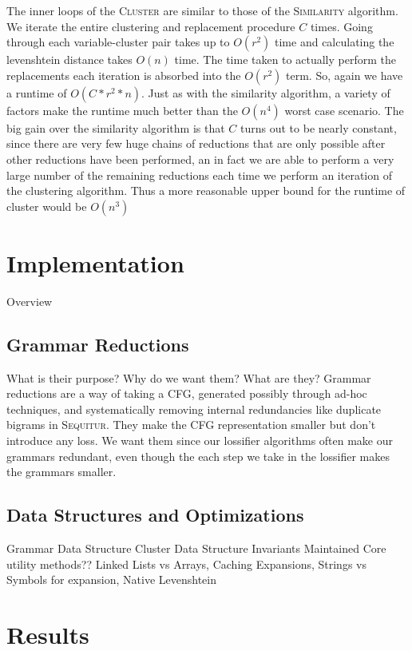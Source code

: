 \documentclass[11pt]{article}
\newcommand{\Sequitur}{\textsc{Sequitur}\xspace}
\newcommand{\Similarity}{\textsc{Similarity}\xspace}
\newcommand{\Cluster}{\textsc{Cluster}\xspace}
\begin{document}
The inner loops of the \Cluster are similar to those of the \Similarity
algorithm.  We iterate the entire clustering and replacement procedure $C$
times. Going through each variable-cluster pair takes up to $O(r^2)$ time and
calculating the levenshtein distance takes $O(n)$ time. The time taken to
actually perform the replacements each iteration is absorbed into the $O(r^2)$
term. So, again we have a runtime of $\boxed{O(C*r^2*n)}$. Just as with the
similarity algorithm, a variety of factors make the runtime much better than
the $\boxed{O(n^4)}$ worst case scenario.  The big gain over the similarity
algorithm is that $C$ turns out to be nearly constant, since there are very few
huge chains of reductions that are only possible after other reductions have
been performed, an in fact we are able to perform a very large number of the
remaining reductions each time we perform an iteration of the clustering
algorithm. Thus a more reasonable upper bound for the runtime of cluster would
be $\boxed{O(n^3)}$

\section{Implementation}

Overview

\subsection{Grammar Reductions}

What is their purpose? Why do we want them? What are they?  Grammar reductions
are a way of taking a CFG, generated possibly through ad-hoc techniques, and
systematically removing internal redundancies like duplicate bigrams in
\Sequitur. They make the CFG representation smaller but don't introduce any
loss. We want them since our lossifier algorithms often make our grammars
redundant, even though the each step we take in the lossifier makes the
grammars smaller.

\subsection{Data Structures and Optimizations}

Grammar Data Structure
Cluster Data Structure
Invariants Maintained
Core utility methods??
Linked Lists vs Arrays, Caching Expansions, Strings vs Symbols for expansion, Native Levenshtein

\section{Results}
\end{document}
